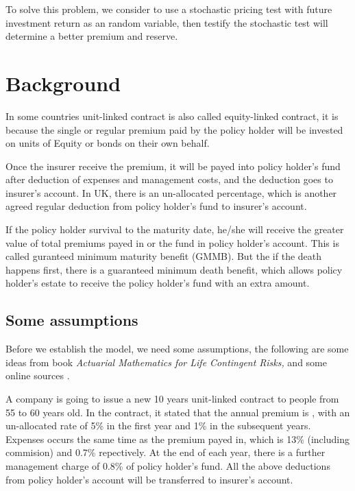 \documentclass{report}
\begin{document}
To solve this problem, we consider to use a stochastic pricing test with future investment return as an random variable, then testify the stochastic test will determine a better premium and reserve. 


\section{Background}

In some countries unit-linked contract is also called equity-linked contract, it is because the single or regular premium paid by the policy holder will be invested on units of Equity or bonds on their own behalf.


Once the insurer receive the premium, it will be payed into policy holder's fund after deduction of expenses and management costs, and the deduction goes to insurer's account. In UK, there is an un-allocated percentage, which is another agreed regular deduction from policy holder's fund to insurer's account.

 \cite{bib:GMMB}If the policy holder survival to the maturity date, he/she will receive the greater value of total premiums payed in or the fund in policy holder's account. This is called guranteed minimum maturity benefit (GMMB). But the if the death happens first, there is a guaranteed minimum death benefit, which allows policy holder's estate to receive the policy holder's fund with an extra amount. 


\subsection{Some assumptions}  \label{unit-link-basic-assumptions}

Before we establish the model, we need some assumptions, the following are some ideas from  \cite{bib:unitlinkeg} book {\em Actuarial Mathematics for Life Contingent Risks,} and some online sources \cite{bib:unitlinkedonline}. 


A company is going to issue a new 10 years unit-linked contract to people from 55 to 60 years old. In the contract, it stated that the annual premium is , with an un-allocated rate of 5\% in the first year and 1\% in the subsequent years. Expenses occurs the same time as the premium payed in, which is 13\% (including commision) and 0.7\% repectively. At the end of each year, there is a further management charge of 0.8\% of policy holder's fund. All the above deductions from policy holder's account will be transferred to insurer's account.
\end{document}
